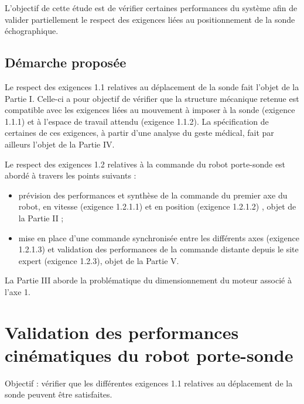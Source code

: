 L'objectif de cette étude est de vérifier certaines performances du système afin de valider partiellement le respect des exigences liées au positionnement de la sonde échographique.

\subsection{Démarche proposée}
Le respect des exigences 1.1 relatives au déplacement de la sonde fait l'objet de la Partie I. Celle-ci a pour objectif de vérifier que la structure mécanique retenue est compatible avec les exigences liées au mouvement à imposer à la sonde (exigence 1.1.1) et à l'espace de travail attendu (exigence 1.1.2). La spécification de certaines de ces exigences, à partir d'une analyse du geste médical, fait par ailleurs l'objet de la Partie IV.

Le respect des exigences 1.2 relatives à la commande du robot porte-sonde est abordé à travers les points suivants :

\begin{itemize}
  \item[-] prévision des performances et synthèse de la commande du premier axe du robot, en vitesse (exigence 1.2.1.1) et en position (exigence 1.2.1.2) , objet de la Partie II ;
  \item[-] mise en place d'une commande synchronisée entre les différents axes (exigence 1.2.1.3) et validation des performances de la commande distante depuis le site expert (exigence 1.2.3), objet de la Partie V.
\end{itemize}

La Partie III aborde la problématique du dimensionnement du moteur associé à l'axe 1.

\section{Validation des performances cinématiques du robot porte-sonde}
Objectif : vérifier que les différentes exigences 1.1 relatives au déplacement de la sonde peuvent être satisfaites.

